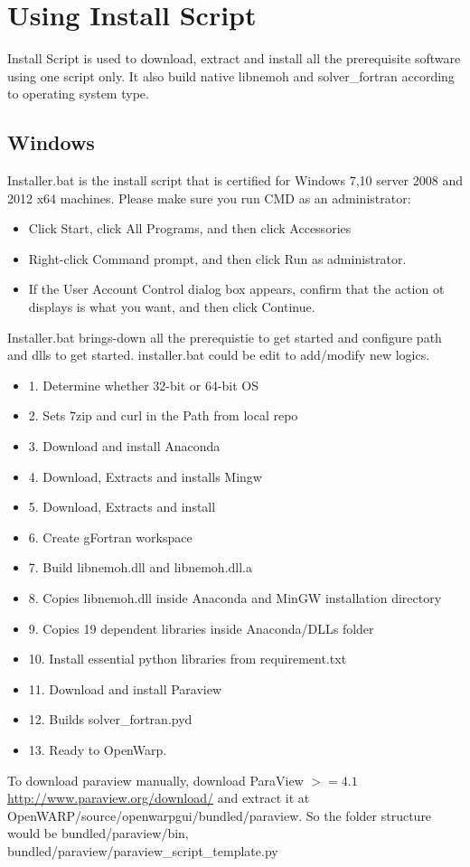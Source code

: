 \documentclass[12pt]{article}
\begin{document}
\section{Using Install Script}
Install Script is used to download, extract and install all the prerequisite software using one script only. It also build native libnemoh and solver_fortran according to operating system type.

\subsection{Windows}
 Installer.bat is the install script that is certified for Windows 7,10 server 2008 and 2012 x64 machines. Please make sure you run CMD as an administrator:
\begin{itemize}
\item Click Start, click All Programs, and then click Accessories
\item Right-click Command prompt, and then click Run as administrator.
\item If the User Account Control dialog box appears, confirm that the action ot displays is what you want, and then click Continue.
\end{itemize}
Installer.bat brings-down all the prerequistie to get started and configure path and dlls to get started. installer.bat could be edit to add/modify new logics.
 \begin{itemize}
 \item 1. Determine whether 32-bit or 64-bit OS
 \item 2. Sets 7zip and curl in the Path from local repo
 \item 3. Download and install Anaconda 
 \item 4. Download, Extracts and installs Mingw
 \item 5. Download, Extracts and install  
 \item 6. Create gFortran workspace 
 \item 7. Build libnemoh.dll and libnemoh.dll.a
 \item 8. Copies libnemoh.dll inside Anaconda and MinGW installation directory
 \item 9. Copies 19 dependent libraries inside Anaconda/DLLs folder
 \item 10. Install essential python libraries from requirement.txt
 \item 11. Download and install Paraview
 \item 12. Builds solver_fortran.pyd 
 \item 13. Ready to OpenWarp.  
 \end{itemize}
To download paraview manually, download ParaView $>=4.1$  \url{http://www.paraview.org/download/} and extract it at OpenWARP/source/openwarpgui/bundled/paraview. So the folder structure would be bundled/paraview/bin, bundled/paraview/paraview_script_template.py
  
\end{document}
